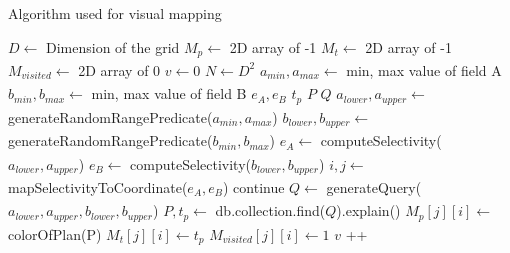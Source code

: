 \begin{algorithm}
    \caption{Algorithm used for visual mapping}
    \label{alg:vm}
    \begin{algorithmic}
        \STATE $D \xleftarrow[]{} $ Dimension of the grid 
        \STATE $M_{p} \xleftarrow[]{} $ 2D array of -1 
        \STATE $M_{t} \xleftarrow[]{} $ 2D array of -1  
        \STATE $M_{visited} \xleftarrow[]{} $ 2D array of 0 
        \STATE $v \xleftarrow[]{} 0$  
        \STATE $N \xleftarrow[]{} D^2$  
        \STATE $a_{min}, a_{max} \xleftarrow[]{}$  min, max value of field A
        \STATE $b_{min}, b_{max} \xleftarrow[]{}$  min, max value of field B
        \STATE $e_A, e_B $ 
        \STATE $t_p$ 
        \STATE $P$ 
        \STATE $Q$ 
        \STATE
            \STATE $a_{lower}, a_{upper} \xleftarrow[]{}$ generateRandomRangePredicate($a_{min}, a_{max}$)
            \STATE $b_{lower}, b_{upper} \xleftarrow[]{}$ generateRandomRangePredicate($b_{min}, b_{max}$)
            \STATE $e_A \xleftarrow[]{}$ computeSelectivity($a_{lower}, a_{upper}$)
            \STATE $e_B \xleftarrow[]{}$ computeSelectivity($b_{lower}, b_{upper}$)
            \STATE $i, j \xleftarrow[]{}$ mapSelectivityToCoordinate($e_A, e_B$)
            \STATE 
                \STATE continue
            \ENDIF
            \STATE
            \STATE $Q \xleftarrow[]{}$ generateQuery($a_{lower}, a_{upper}, b_{lower}, b_{upper}$)
            \STATE $P, t_p\xleftarrow[]{}$  db.collection.find($Q$).explain()
            \STATE
            \STATE $M_{p}[j][i] \xleftarrow[]{}$ colorOfPlan(P)
            \STATE
            \STATE $M_{t}[j][i] \xleftarrow[]{} t_p$ 
            \STATE $M_{visited}[j][i] \xleftarrow[]{} 1$
            \STATE $v$ ++
            
        \ENDWHILE
        
    \end{algorithmic}
    \label{alg:map}
\end{algorithm}

